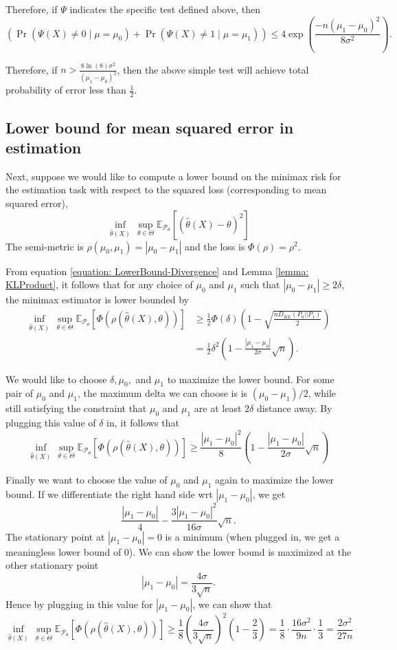 \documentclass{article}
\newcommand{\Pd}{\mathcal{P}}
\newcommand{\Ev}{\mathbb{E}}
\begin{document}
	Therefore, if $\Psi$ indicates the specific test defined above, then
	\[\left( \Pr(\Psi(X) \neq 0 \mid \mu = \mu_0) + \Pr(\Psi(X) \neq 1 \mid \mu = \mu_1) \right) \leq 4 \exp\left(\frac{-n (\mu_1 - \mu_0)^2}{8\sigma^2}\right).\]
	
	Therefore, if $n > \frac{8 \ln(8) \sigma^2}{(\mu_1 - \mu_0)^2}$, then the above simple test will achieve total probability of error less than $\frac12$. 
	
	\subsection{Lower bound for mean squared error in estimation}
	Next, suppose we would like to compute a lower bound on the minimax risk for the estimation task with respect to the squared loss (corresponding to mean squared error),
	\[ \inf_{\hat\theta(X)} \, \sup_{\theta \in \Theta} \Ev_{\Pd_\theta} \left[ (\hat\theta(X) - \theta)^2 \right]\]
	The semi-metric is $\rho(\mu_0,\mu_1) = |\mu_0 - \mu_1|$ and the loss is $\Phi(\rho) = \rho^2$.
	
	From equation \ref{equation: LowerBound-Divergence} and Lemma 
	\ref{lemma: KLProduct}, it follows that for any choice of $\mu_0$ and $\mu_1$ such that $|\mu_0 - \mu_1| \geq 2\delta$, the minimax estimator is lower bounded by
	\begin{align*}
	\inf_{\hat\theta(X)} \, \sup_{\theta \in \Theta} \Ev_{\Pd_\theta} \left[ \Phi(\rho(\hat\theta(X),\theta))\right] &\geq \frac{1}{2}\Phi(\delta) \left( 1 -  \sqrt{\frac{nD_{KL}(P_0 || P_1)}{2}} \right) \\
	&= \frac{1}{2}\delta^2 \left(1 -  \frac{|\mu_1 - \mu_0|}{2\sigma}\sqrt{n}\right).
	\end{align*}
	
	We would like to choose $\delta, \mu_0,$ and $\mu_1$ to maximize the lower bound. For some pair of $\mu_0$ and $\mu_1$, the maximum delta we can choose is is $(\mu_0 - \mu_1)/2$, while still satisfying the constraint that $\mu_0$ and $\mu_1$ are at least $2\delta$ distance away. By plugging this value of $\delta$ in, it follows that
	\[
	\inf_{\hat\theta(X)} \, \sup_{\theta \in \Theta} \Ev_{\Pd_\theta} \left[ \Phi(\rho(\hat\theta(X),\theta))\right] \geq \frac{|\mu_1 - \mu_0|^2}{8} \left( 1 -  \frac{|\mu_1 - \mu_0|}{2\sigma}\sqrt{n} 
	\right)
	\]
	
	Finally we want to choose the value of $\mu_0$ and $\mu_1$ again to maximize the lower bound. If we differentiate the right hand side wrt $|\mu_1-\mu_0|$, we get
	\[\frac{|\mu_1 - \mu_0|}{4}   -  \frac{3|\mu_1 - \mu_0|^2}{16\sigma}\sqrt{n}.\]
	The stationary point at $|\mu_1-\mu_0|=0$ is a minimum (when plugged in, we get a meaningless lower bound of 0). We can show the lower bound is maximized at the other stationary point
	\[|\mu_1-\mu_0| = \frac{4\sigma}{3\sqrt{n}}.\]
	Hence by plugging in this value for $|\mu_1-\mu_0|$, we can show that 
	\[
	\inf_{\hat\theta(X)} \, \sup_{\theta \in \Theta} \Ev_{\Pd_\theta} \left[ \Phi(\rho(\hat\theta(X),\theta))\right] \geq \frac{1}{8}\left(\frac{4\sigma}{3\sqrt{n}}\right)^2\left(1 - \frac{2}{ 3}\right) = \frac{1}{8}\cdot\frac{16\sigma^2}{9n} \cdot \frac{1}{3} =
	\frac{2\sigma^2}{27 n} \]
	
\end{document}
